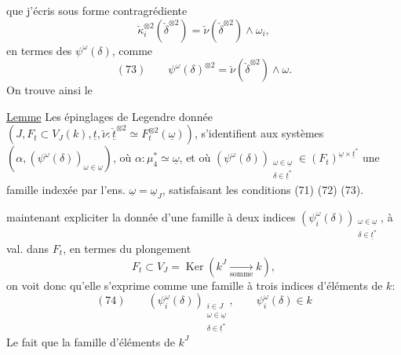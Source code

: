 que j'écris sous forme contragrédiente
\[
\check\kappa_i^{\otimes2}(\check\delta^{\otimes2})
=\check\nu(\check\delta^{\otimes2})\wedge\omega_i,
\]
en termes des $\psi^\omega(\delta)$, comme
\[
(73)\qquad\psi^\omega(\delta)^{\otimes2}
=\check\nu(\check\delta^{\otimes2})\wedge\omega.
\]
On trouve ainsi le

\uline{Lemme} Les épinglages de Legendre 
donnée $(J,F_t\subset V_J(k),\underline t,\check\nu:\check{\underline t}^{\otimes2}\simeq F_t^{\otimes2}(\underline\omega))$,
s'identifient aux systèmes $(\alpha,(\psi^\omega(\delta))_{\omega\in\underline\omega})$, où
$\alpha:\mu_4^*\simeq\underline\omega$, et où
$(\psi^\omega(\delta))_{\substack{\omega\in\underline\omega\\\delta\in\underline t^*}}\in(F_t)^{\underline\omega\times\underline t^*}$
une famille indexée par l'ens. 
 $\underline\omega=\underline\omega_J$, satisfaisant les conditions
(71) (72) (73).

  maintenant expliciter la
donnée d'une famille à deux indices
$(\psi_i^\omega(\delta))_{\substack{\omega\in\underline\omega\\\delta\in\underline t^*}}$, à val. dans $F_t$, en termes du
plongement
\[
F_t\subset V_J=\operatorname{Ker}(k^J\xrightarrow[\mathrm{somme}]{}k),
\]
on voit donc qu'elle s'exprime comme
une famille à trois indices d'éléments de $k$:
\[
(74)\qquad(\psi_i^\omega(\delta))_{\substack{i\in J\\\omega\in\underline\omega\\\delta\in\underline t^*}},\qquad\psi_i^\omega(\delta)\in k
\]
Le fait que la famille d'éléments \unsure{$\in$} de $k^J$
